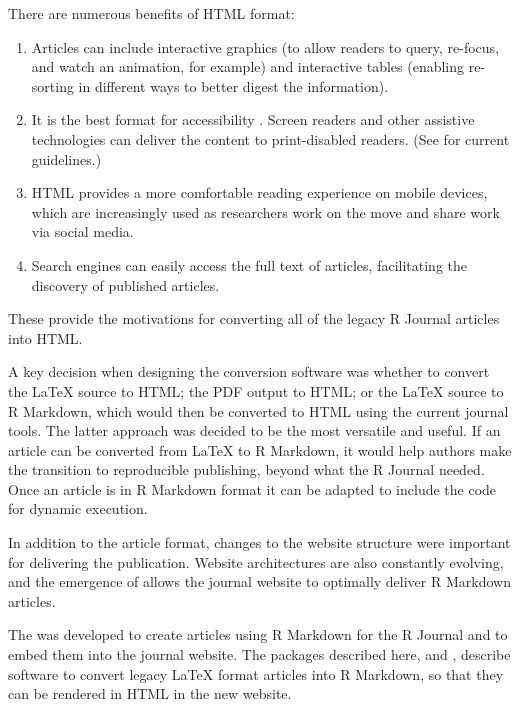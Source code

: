 There are numerous benefits of HTML format:

\begin{enumerate}
\def\labelenumi{\arabic{enumi}.}
\tightlist
\item
  Articles can include interactive graphics (to allow readers to query, re-focus, and watch an animation, for example) and interactive tables (enabling re-sorting in different ways to better digest the information).
\item
  It is the best format for accessibility \citep{Daisy}. Screen readers and other assistive technologies can deliver the content to print-disabled readers. (See \citet{W3C} for current guidelines.)
\item
  HTML provides a more comfortable reading experience on mobile devices, which are increasingly used as researchers work on the move and share work via social media.
\item
  Search engines can easily access the full text of articles, facilitating the discovery of published articles.
\end{enumerate}

These provide the motivations for converting all of the legacy R Journal articles into HTML.

A key decision when designing the conversion software was whether to convert the LaTeX source to HTML; the PDF output to HTML; or the LaTeX source to R Markdown, which would then be converted to HTML using the current journal tools. The latter approach was decided to be the most versatile and useful. If an article can be converted from LaTeX to R Markdown, it would help authors make the transition to reproducible publishing, beyond what the R Journal needed. Once an article is in R Markdown format it can be adapted to include the code for dynamic execution.

In addition to the article format, changes to the website structure were important for delivering the publication. Website architectures are also constantly evolving, and the emergence of  \citep{distill} allows the journal website to optimally deliver R Markdown articles.

The  was developed to create articles using R Markdown for the R Journal and to embed them into the journal website. The packages described here,  and , describe software to convert legacy LaTeX format articles into R Markdown, so that they can be rendered in HTML in the new website.


